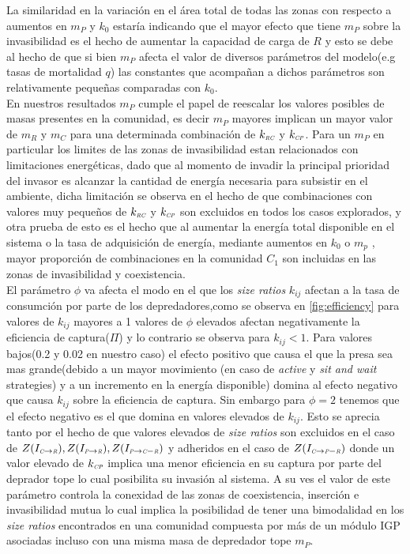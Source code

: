 La similaridad en la variaci\'on en el \'area total de todas las zonas con respecto a aumentos en $m_P$ y $k_0$ estar\'ia indicando que el mayor efecto que tiene $m_P$ sobre la invasibilidad es el hecho de aumentar la capacidad de carga de $R$ y esto se debe al hecho de que si bien $m_P$ afecta el valor de diversos par\'ametros del modelo(e.g tasas de mortalidad $q$) las constantes que acompa\~nan a dichos par\'ametros son relativamente peque\~nas comparadas con $k_0$.\\
En nuestros resultados $m_P$ cumple el papel de reescalar los valores posibles de masas presentes en la comunidad, es decir $m_P$ mayores implican un mayor valor de $m_R$ y $m_C$ para una determinada combinaci\'on de $k_{\textit{\tiny RC}}$ y $k_{\textit{\tiny CP}}$. Para un $m_P$ en particular los limites de las zonas de invasibilidad estan relacionados con limitaciones energ\'eticas, dado que al momento de invadir la principal prioridad del invasor es alcanzar la cantidad de energ\'ia necesaria para subsistir en el ambiente, dicha limitaci\'on se observa en el hecho de que combinaciones con valores muy peque\~nos de $k_{\textit{\tiny RC}}$ y $k_{\textit{\tiny CP}}$ son excluidos en todos los casos explorados, y otra prueba de esto es el hecho que al aumentar la energ\'ia total disponible en el sistema o la tasa de adquisici\'on de energ\'ia, mediante aumentos en $k_0$ o $m_p$ , mayor proporci\'on de combinaciones en la comunidad $C_1$ son incluidas en las zonas de invasibilidad y coexistencia.\\


El par\'ametro $\phi$ va afecta el modo en el que los \emph{size ratios} $k_{ij}$ afectan a la tasa de consumci\'on por parte de los depredadores,como se observa en \ref{fig:efficiency} para valores de $k_{ij}$ mayores a 1 valores de $\phi$ elevados afectan negativamente la eficiencia de captura($\Pi$) y lo contrario se observa para $k_{ij} <1$. Para valores bajos(0.2 y 0.02 en nuestro caso) el efecto positivo que causa el que la presa sea mas grande(debido a un mayor movimiento (en caso de \emph{active} y \emph{sit and wait} strategies) y a un incremento en la energ\'ia disponible) domina al efecto negativo que causa $k_{ij}$ sobre la eficiencia de captura. Sin embargo para $\phi = 2$ tenemos que el efecto negativo es el que domina en valores elevados de $k_{ij}$. Esto se aprecia tanto por el hecho de que valores elevados de \emph{size ratios} son excluidos en el caso de $Z(I_{\textit{\tiny C} \to \textit{\tiny R}}),Z(I_{\textit{\tiny P} \to \textit{\tiny R}}),Z(I_{\textit{\tiny P} \to \textit{\tiny C}-\textit{\tiny R}})$ y adheridos en el caso de $Z(I_{\textit{\tiny C} \to \textit{\tiny P} -\textit{\tiny R}})$ donde un valor elevado de $k_{\textit{\tiny CP}}$ implica una menor eficiencia en su captura por parte del deprador tope lo cual posibilita su invasi\'on al sistema. A su ves el valor de este par\'ametro controla la conexidad de las zonas de coexistencia, inserci\'on e invasibilidad mutua lo cual implica la posibilidad de tener una bimodalidad en los \emph{size ratios} encontrados en una comunidad compuesta por m\'as de un m\'odulo IGP asociadas incluso con una misma masa de depredador tope $m_P$.\\

